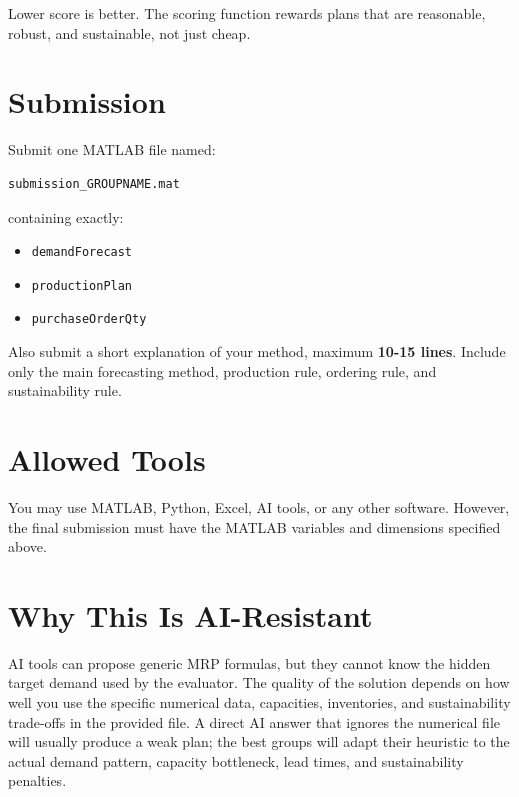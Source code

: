 \documentclass[11pt,a4paper]{article}
\begin{document}
Lower score is better. The scoring function rewards plans that are reasonable, robust, and sustainable, not just cheap.

\section*{Submission}
Submit one MATLAB file named:
\begin{verbatim}
submission_GROUPNAME.mat
\end{verbatim}
containing exactly:
\begin{itemize}
    \item \texttt{demandForecast}
    \item \texttt{productionPlan}
    \item \texttt{purchaseOrderQty}
\end{itemize}

Also submit a short explanation of your method, maximum \textbf{10-15 lines}. Include only the main forecasting method, production rule, ordering rule, and sustainability rule.

\section*{Allowed Tools}
You may use MATLAB, Python, Excel, AI tools, or any other software. However, the final submission must have the MATLAB variables and dimensions specified above.

\section*{Why This Is AI-Resistant}
AI tools can propose generic MRP formulas, but they cannot know the hidden target demand used by the evaluator. The quality of the solution depends on how well you use the specific numerical data, capacities, inventories, and sustainability trade-offs in the provided file. A direct AI answer that ignores the numerical file will usually produce a weak plan; the best groups will adapt their heuristic to the actual demand pattern, capacity bottleneck, lead times, and sustainability penalties.
\end{document}
